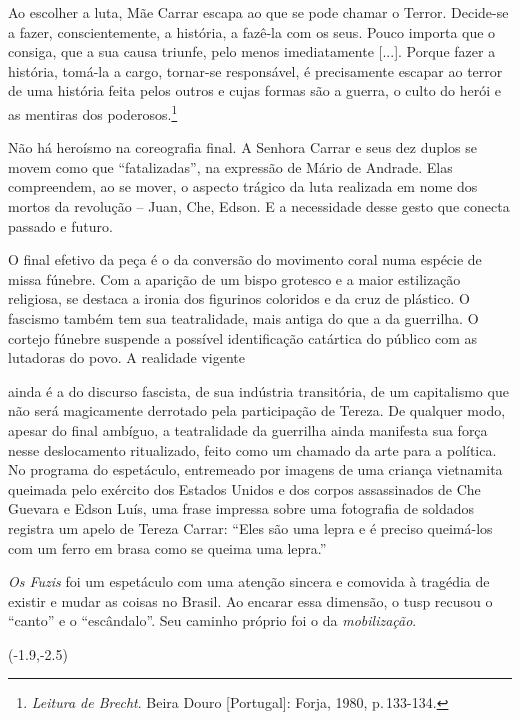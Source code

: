 \startblockquote
Ao escolher a luta, Mãe Carrar escapa ao que se pode chamar o Terror.
Decide-se a fazer, conscientemente, a história, a fazê-la com os seus.
Pouco importa que o consiga, que a sua causa triunfe, pelo menos
imediatamente {[}...{]}. Porque fazer a história, tomá-la a cargo,
tornar-se responsável, é precisamente escapar ao terror de uma história
feita pelos outros e cujas formas são a guerra, o culto do herói e as
mentiras dos poderosos.\footnote{{\it Leitura de Brecht}. Beira Douro
  {[}Portugal{]}: Forja, 1980, p.\,133-134.}
\stopblockquote

Não há heroísmo na coreografia final. A Senhora Carrar e seus dez duplos
se movem como que “fatalizadas”, na expressão de Mário de Andrade. Elas
compreendem, ao se mover, o aspecto trágico da luta realizada em nome
dos mortos da revolução -- Juan, Che, Edson. E a necessidade desse gesto
que conecta passado e futuro.

O final efetivo da peça é o da conversão do movimento coral numa espécie
de missa fúnebre. Com a aparição de um bispo grotesco e a maior
estilização religiosa, se destaca a ironia dos figurinos coloridos e da
cruz de plástico. O fascismo também tem sua teatralidade, mais antiga do
que a da guerrilha. O cortejo fúnebre suspende a possível identificação
catártica do público com as lutadoras do povo. A realidade vigente

\column

\noindent{}ainda
é a do discurso fascista, de sua indústria transitória, de um
capitalismo que não será magicamente derrotado pela participação de
Tereza. De qualquer modo, apesar do final ambíguo, a teatralidade da
guerrilha ainda manifesta sua força nesse deslocamento ritualizado,
feito como um chamado da arte para a política. No programa do
espetáculo, entremeado por imagens de uma criança vietnamita queimada
pelo exército dos Estados Unidos e dos corpos assassinados de Che
Guevara e Edson Luís, uma frase impressa sobre uma fotografia de
soldados registra um apelo de Tereza Carrar: “Eles são uma lepra e é
preciso queimá-los com um ferro em brasa como se queima uma lepra.”

{\it Os Fuzis} foi um espetáculo com uma atenção sincera e comovida à
tragédia de existir e mudar as coisas no Brasil. Ao encarar essa
dimensão, o {\sc tusp} recusou o “canto” e o “escândalo”. Seu caminho próprio
foi o da {\it mobilização}.

\startpositioning
   \position(-1.9,-2.5){}
\stoppositioning   


